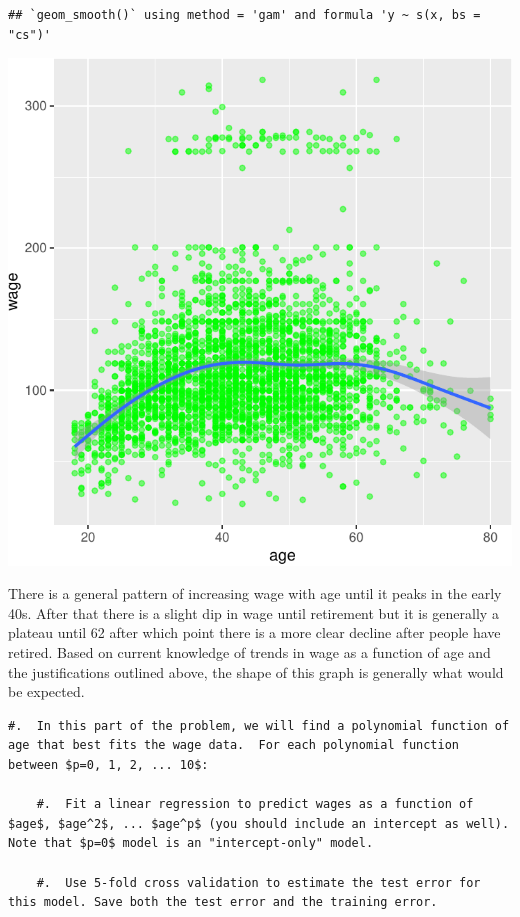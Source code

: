 \documentclass[]{article}
\begin{document}
\begin{verbatim}
## `geom_smooth()` using method = 'gam' and formula 'y ~ s(x, bs = "cs")'
\end{verbatim}

\begin{center}\includegraphics{homework1-handout_files/figure-latex/unnamed-chunk-11-1} \end{center}

There is a general pattern of increasing wage with age until it peaks in
the early 40s. After that there is a slight dip in wage until retirement
but it is generally a plateau until 62 after which point there is a more
clear decline after people have retired. Based on current knowledge of
trends in wage as a function of age and the justifications outlined
above, the shape of this graph is generally what would be expected.

\begin{verbatim}
#.  In this part of the problem, we will find a polynomial function of age that best fits the wage data.  For each polynomial function between $p=0, 1, 2, ... 10$:

    #.  Fit a linear regression to predict wages as a function of $age$, $age^2$, ... $age^p$ (you should include an intercept as well).  Note that $p=0$ model is an "intercept-only" model.
    
    #.  Use 5-fold cross validation to estimate the test error for this model. Save both the test error and the training error.  
\end{verbatim}
\end{document}
